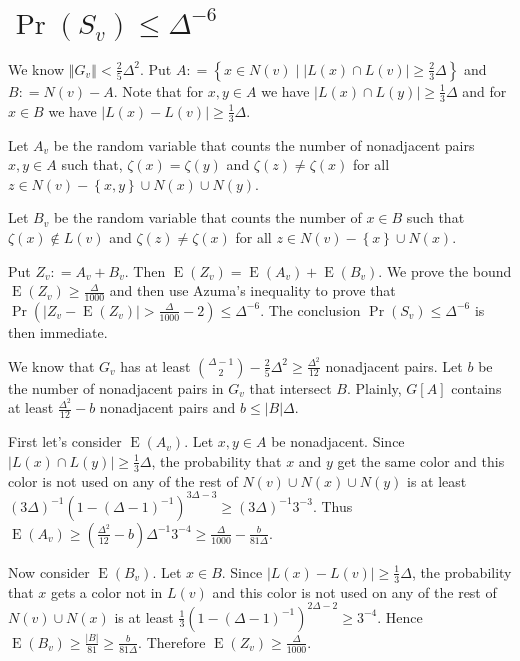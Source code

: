 \documentclass[12pt]{amsart}
\theoremstyle{plain}
\theoremstyle{definition}
\theoremstyle{remark}
\newcommand{\set}[1]{\left\{ #1 \right\}}
\newcommand{\setb}[3]{\left\{ #1 \in #2 \mid #3 \right\}}
\newcommand{\card}[1]{\left|#1\right|}
\newcommand{\size}[1]{\left\Vert#1\right\Vert}
\newcommand{\DefinedAs}{\mathrel{\mathop:}=}
\newcommand{\ex}{\operatorname{E}}
\begin{document}
\section{$\Pr(S_v) \leq \Delta^{-6}$}
We know $\size{G_v} < \frac25 \Delta^2$.  Put $A \DefinedAs
\setb{x}{N(v)}{\card{L(x) \cap L(v)} \geq \frac23 \Delta}$ and $B \DefinedAs
N(v) - A$.  Note that for $x, y \in A$ we have $\card{L(x) \cap L(y)} \geq
\frac13 \Delta$ and for $x \in B$ we have $\card{L(x) - L(v)} \geq \frac13
\Delta$.

Let $A_v$ be the random variable that counts the number of nonadjacent pairs
$x, y \in A$ such that, $\zeta(x) = \zeta(y)$ and $\zeta(z) \neq \zeta(x)$ for
all $z \in N(v) - \set{x, y} \cup N(x) \cup N(y)$.

Let $B_v$ be the random variable that counts the number of $x \in B$ such that
$\zeta(x) \not \in L(v)$ and $\zeta(z) \neq \zeta(x)$ for all $z \in N(v) -
\set{x} \cup N(x)$.

Put $Z_v \DefinedAs A_v + B_v$.  Then $\ex(Z_v) = \ex(A_v) + \ex(B_v)$.  We
prove the bound $\ex(Z_v) \geq \frac{\Delta}{1000}$ and then use Azuma's
inequality to prove that $\Pr(\card{Z_v - \ex(Z_v)} > \frac{\Delta}{1000} - 2)
\leq \Delta^{-6}$. The conclusion $\Pr(S_v) \leq \Delta^{-6}$ is then immediate.

We know that $G_v$ has at least ${\Delta - 1 \choose 2} - \frac25 \Delta^2 \geq
\frac{\Delta^2}{12}$ nonadjacent pairs.  Let $b$ be the number of nonadjacent pairs in $G_v$ that intersect $B$. 
Plainly, $G[A]$ contains at least $\frac{\Delta^2}{12} - b$ nonadjacent pairs
and $b \leq \card{B}\Delta$.

First let's consider $\ex(A_v)$.  Let $x, y \in A$ be nonadjacent.  Since $\card{L(x) \cap L(y)} \geq
\frac13 \Delta$, the probability that $x$ and $y$ get the same color and this
color is not used on any of the rest of $N(v) \cup N(x) \cup N(y)$ is at least
$(3\Delta)^{-1} (1-(\Delta-1)^{-1})^{3\Delta - 3} \geq (3\Delta)^{-1}3^{-3}$. 
Thus $\ex(A_v) \geq (\frac{\Delta^2}{12} - b)\Delta^{-1}3^{-4} \geq
\frac{\Delta}{1000} - \frac{b}{81\Delta}$.

Now consider $\ex(B_v)$.  Let $x \in B$.  Since $\card{L(x) - L(v)} \geq \frac13
\Delta$, the probability that $x$ gets a color not in $L(v)$ and this color is
not used on any of the rest of $N(v) \cup N(x)$ is at least $\frac13
(1-(\Delta-1)^{-1})^{2\Delta - 2} \geq 3^{-4}$.  Hence $\ex(B_v) \geq
\frac{\card{B}}{81} \geq \frac{b}{81\Delta}$.  Therefore $\ex(Z_v) \geq
\frac{\Delta}{1000}$.
\end{document}
